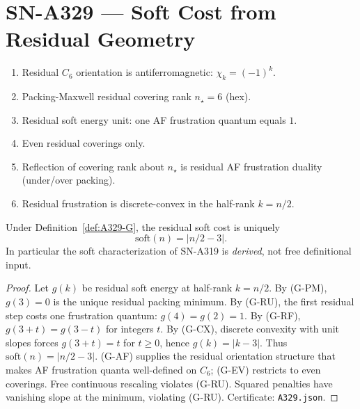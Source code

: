 \section{SN-A329 --- Soft Cost from Residual Geometry}
\label{sec:SN-A329}

\begin{definition}
\label{def:A329-G}
\begin{enumerate}[label=(G-\Alph*)]
\item[\textbf{(G-AF)}] Residual $C_6$ orientation is antiferromagnetic: $\chi_k=(-1)^k$.
\item[\textbf{(G-PM)}] Packing-Maxwell residual covering rank $n_\star=6$ (hex).
\item[\textbf{(G-RU)}] Residual soft energy unit: one AF frustration quantum equals $1$.
\item[\textbf{(G-EV)}] Even residual coverings only.
\item[\textbf{(G-RF)}] Reflection of covering rank about $n_\star$ is residual AF frustration duality (under/over packing).
\item[\textbf{(G-CX)}] Residual frustration is discrete-convex in the half-rank $k=n/2$.
\end{enumerate}
\end{definition}

\begin{theorem}
\label{thm:A329}
Under Definition~\ref{def:A329-G}, the residual soft cost is uniquely
\begin{equation}
\mathrm{soft}(n)=\bigl|n/2-3\bigr|.
\end{equation}
In particular the soft characterization of SN-A319 is \emph{derived}, not free definitional input.
\end{theorem}

\begin{proof}
Let $g(k)$ be residual soft energy at half-rank $k=n/2$.
By (G-PM), $g(3)=0$ is the unique residual packing minimum.
By (G-RU), the first residual step costs one frustration quantum: $g(4)=g(2)=1$.
By (G-RF), $g(3+t)=g(3-t)$ for integers $t$.
By (G-CX), discrete convexity with unit slopes forces $g(3+t)=t$ for $t\ge 0$, hence $g(k)=|k-3|$.
Thus $\mathrm{soft}(n)=|n/2-3|$.
(G-AF) supplies the residual orientation structure that makes AF frustration quanta well-defined on $C_6$; (G-EV) restricts to even coverings.
Free continuous rescaling violates (G-RU). Squared penalties have vanishing slope at the minimum, violating (G-RU).
Certificate: \texttt{A329.json}.
\end{proof}

